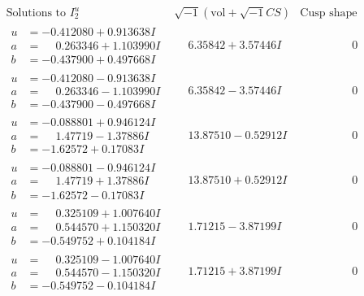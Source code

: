 \documentclass[1p]{elsarticle_modified}
\theoremstyle{definition}
\newcommand{\I}{\sqrt{-1}}
\begin{document}
$$\begin{array}{c|c|c}  
\text{Solutions to }I^u_{2}& \I (\text{vol} + \sqrt{-1}CS) & \text{Cusp shape}\\
 \hline 
\begin{aligned}
u &= -0.412080 + 0.913638 I \\
a &= \phantom{-}0.263346 + 1.103990 I \\
b &= -0.437900 + 0.497668 I\end{aligned}
 & \phantom{-}6.35842 + 3.57446 I & \phantom{-0.000000 } 0 \\ \hline\begin{aligned}
u &= -0.412080 - 0.913638 I \\
a &= \phantom{-}0.263346 - 1.103990 I \\
b &= -0.437900 - 0.497668 I\end{aligned}
 & \phantom{-}6.35842 - 3.57446 I & \phantom{-0.000000 } 0 \\ \hline\begin{aligned}
u &= -0.088801 + 0.946124 I \\
a &= \phantom{-}1.47719 - 1.37886 I \\
b &= -1.62572 + 0.17083 I\end{aligned}
 & \phantom{-}13.87510 - 0.52912 I & \phantom{-0.000000 } 0 \\ \hline\begin{aligned}
u &= -0.088801 - 0.946124 I \\
a &= \phantom{-}1.47719 + 1.37886 I \\
b &= -1.62572 - 0.17083 I\end{aligned}
 & \phantom{-}13.87510 + 0.52912 I & \phantom{-0.000000 } 0 \\ \hline\begin{aligned}
u &= \phantom{-}0.325109 + 1.007640 I \\
a &= \phantom{-}0.544570 + 1.150320 I \\
b &= -0.549752 + 0.104184 I\end{aligned}
 & \phantom{-}1.71215 - 3.87199 I & \phantom{-0.000000 } 0 \\ \hline\begin{aligned}
u &= \phantom{-}0.325109 - 1.007640 I \\
a &= \phantom{-}0.544570 - 1.150320 I \\
b &= -0.549752 - 0.104184 I\end{aligned}
 & \phantom{-}1.71215 + 3.87199 I & \phantom{-0.000000 } 0 \\ \hline\begin{aligned}

\end{aligned}
\end{array}$$
\end{document}
